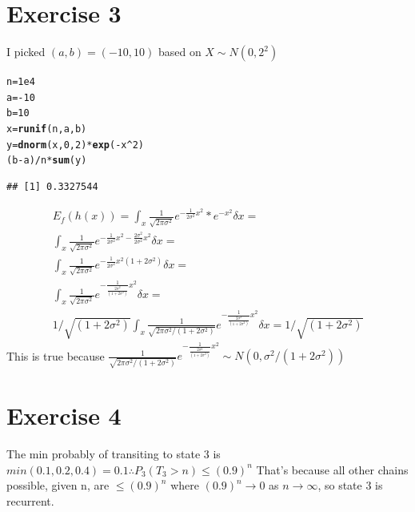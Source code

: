 \documentclass{article}\usepackage[]{graphicx}\usepackage[]{color}
\makeatletter
\newcommand{\hlnum}[1]{\textcolor[rgb]{0.686,0.059,0.569}{#1}}%
\newcommand{\hlopt}[1]{\textcolor[rgb]{0,0,0}{#1}}%
\newcommand{\hlstd}[1]{\textcolor[rgb]{0.345,0.345,0.345}{#1}}%
\newcommand{\hlkwb}[1]{\textcolor[rgb]{0.69,0.353,0.396}{#1}}%
\newcommand{\hlkwd}[1]{\textcolor[rgb]{0.737,0.353,0.396}{\textbf{#1}}}%
\newenvironment{kframe}{%
 \def\at@end@of@kframe{}%
 \ifinner\ifhmode%
  \def\at@end@of@kframe{\end{minipage}}%
  \begin{minipage}{\columnwidth}%
 \fi\fi%
 \def\FrameCommand##1{\hskip\@totalleftmargin \hskip-\fboxsep
 \colorbox{shadecolor}{##1}\hskip-\fboxsep
     \hskip-\linewidth \hskip-\@totalleftmargin \hskip\columnwidth}%
 \MakeFramed {\advance\hsize-\width
   \@totalleftmargin\z@ \linewidth\hsize
   \@setminipage}}%
 {\par\unskip\endMakeFramed%
 \at@end@of@kframe}
\newenvironment{knitrout}{}{} %
\makeatother
\begin{document}
\section*{Exercise 3}
I picked $(a,b) = (-10,10)$ based on $X\sim N(0,2^2)$
\begin{knitrout}
\color{fgcolor}\begin{kframe}
\begin{alltt}
\hlstd{n} \hlkwb{=} \hlnum{1e4}
\hlstd{a} \hlkwb{=} \hlopt{-}\hlnum{10}
\hlstd{b} \hlkwb{=} \hlnum{10}
\hlstd{x} \hlkwb{=} \hlkwd{runif}\hlstd{(n, a, b)}
\hlstd{y} \hlkwb{=} \hlkwd{dnorm}\hlstd{(x,}\hlnum{0}\hlstd{,}\hlnum{2}\hlstd{)}\hlopt{*}\hlkwd{exp}\hlstd{(}\hlopt{-}\hlstd{x}\hlopt{^}\hlnum{2}\hlstd{)}
\hlstd{(b}\hlopt{-}\hlstd{a)}\hlopt{/}\hlstd{n}\hlopt{*}\hlkwd{sum}\hlstd{(y)}
\end{alltt}
\begin{verbatim}
## [1] 0.3327544
\end{verbatim}
\end{kframe}
\end{knitrout}
\begin{equation}
\begin{split}
E_{f}(h(x)) = \int_{x}\frac{1}{\sqrt{2\pi\sigma^{2}}}e^{-\frac{1}{2\sigma^2}x^2}*e^{-x^2} \delta x = \\
\int_{x}\frac{1}{\sqrt{2\pi\sigma^{2}}}e^{-\frac{1}{2\sigma^2}x^2 -\frac{2\sigma^2}{2\sigma^2}x^2} \delta x = \\
\int_{x}\frac{1}{\sqrt{2\pi\sigma^{2}}}e^{-\frac{1}{2\sigma^2}x^2(1+2\sigma^2)} \delta x = \\
\int_{x}\frac{1}{\sqrt{2\pi\sigma^{2}}}e^{-\frac{1}{\frac{2\sigma^2}{(1+2\sigma^2)}}x^2} \delta x = \\
1/\sqrt{(1+2\sigma^2)}\int_{x}\frac{1}{\sqrt{2\pi\sigma^{2}/(1+2\sigma^2)}}e^{-\frac{1}{\frac{2\sigma^2}{(1+2\sigma^2)}}x^2} \delta x =
1/\sqrt{(1+2\sigma^2)}
\end{split}
\end{equation}
This is true because $\frac{1}{\sqrt{2\pi\sigma^{2}/(1+2\sigma^2)}}e^{-\frac{1}{\frac{2\sigma^2}{(1+2\sigma^2)}}x^2}\sim N(0, \sigma^2/(1+2\sigma^2))$

\section*{Exercise 4}
The min probably of transiting to state 3 is $min(0.1, 0.2,0.4)=0.1\therefore P_{3}(T_{3}>n)\leq (0.9)^{n}$ That's because all other chains possible, given n, are $\leq (0.9)^{n}$ where
$(0.9)^{n} \rightarrow 0$ as $n \rightarrow \infty$, so state 3 is recurrent.
\end{document}

